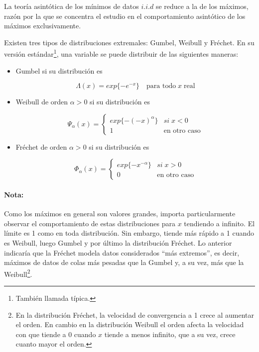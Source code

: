 \documentclass[
  12pt]{article}
\begin{document}
La teoría asintótica de los mínimos de datos \(i.i.d\) se reduce a la de
los máximos, razón por la que se concentra el estudio en el
comportamiento asintótico de los máximos exclusivamente.

\begin{mydefinition}
 Existen tres tipos de distribuciones extremales: Gumbel, Weibull y Fréchet. En su versión estándar\footnote{También llamada típica.}, una variable se puede distribuir de las siguientes maneras:

\begin{itemize}
\item Gumbel si su distribución es 

\begin{equation}
\Lambda(x) = exp\{-e^{-x}\} \quad\text{para todo}\; x \;\text{real} 
\end{equation}

\item Weibull de orden $\alpha>0$ si su distribución es

\begin{equation}
\Psi_{\alpha}(x)=\begin{cases}
exp\{-(-x)^{\alpha}\} & si\;x<0\\
1 & \text{en otro caso}
\end{cases}
\end{equation}

\item Fréchet de orden $\alpha>0$ si su distribución es

\begin{equation}
\Phi_{\alpha}(x)=\begin{cases}
exp\{-x^{-\alpha}\} & si\;x>0\\
0 & \text{en otro caso}
\end{cases}
\end{equation}
\end{itemize}
\end{mydefinition}

\paragraph*{Nota:}

Como los máximos en general son valores grandes, importa particularmente
observar el comportamiento de estas distribuciones para \(x\) tendiendo
a infinito. El límite es 1 como en toda distribución. Sin embargo,
tiende más rápido a 1 cuando es Weibull, luego Gumbel y por último la
distribución Fréchet. Lo anterior indicaría que la Fréchet modela datos
considerados ``más extremos'', es decir, máximos de datos de colas más
pesadas que la Gumbel y, a su vez, más que la
Weibull\footnote{En la distribución Fréchet, la velocidad de convergencia a 1 crece al aumentar el orden. En cambio en la distribución Weibull el orden afecta la velocidad con que tiende a 0 cuando $x$ tiende a menos infinito, que a su vez, crece cuanto mayor el orden.}.
\end{document}
